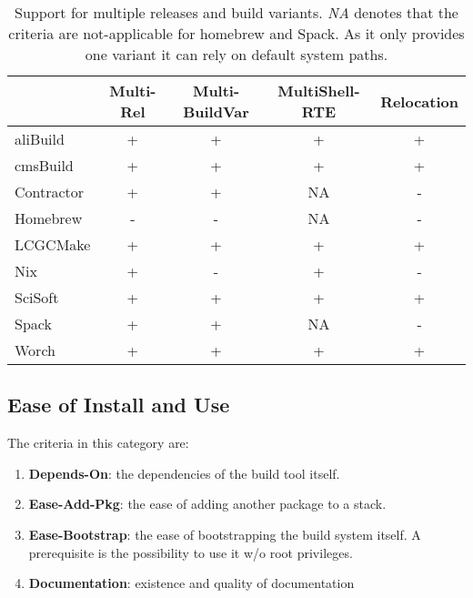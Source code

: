 \documentclass[12pt,a4paper]{article}
\begin{document}
\begin{table}
\centering
\begin{tabular}{lcccc}
&Multi-Rel & Multi-BuildVar & MultiShell-RTE & Relocation \\ \hline
aliBuild & \cellcolor{green} +  & \cellcolor{green} + & \cellcolor{green} + & \cellcolor{green} + \\
cmsBuild & \cellcolor{green} +  & \cellcolor{green} + & \cellcolor{green} + & \cellcolor{green} + \\
Contractor & \cellcolor{green} + & \cellcolor{green} + & \cellcolor{yellow} NA  &  \cellcolor{red} - \\
Homebrew &  \cellcolor{red} - & \cellcolor{red} -   & \cellcolor{yellow} NA   & \cellcolor{red} -  \\
LCGCMake & \cellcolor{green} + & \cellcolor{green} + & \cellcolor{green} + & \cellcolor{green} +\\
Nix & \cellcolor{green} + & \cellcolor{red} - & \cellcolor{green} +  & \cellcolor{red} -\\
SciSoft &  \cellcolor{green} + & \cellcolor{green} + &  \cellcolor{green} + & \cellcolor{green} + \\
Spack & \cellcolor{green} + & \cellcolor{green} + & \cellcolor{yellow} NA & \cellcolor{red} -\\
Worch &  \cellcolor{green} + &  \cellcolor{green}  + &  \cellcolor{green} + &  \cellcolor{green} +
\end{tabular}
\caption{\label{tab:taxonomyVariants}Support for multiple releases and build variants. \emph{NA} denotes that the criteria are not-applicable for homebrew and Spack. As it only provides one variant it can rely on default system paths.}
\end{table}

\subsection{Ease of Install and Use}
The criteria in this category are:
\begin{enumerate}
\item \textbf{Depends-On}: the dependencies of the build tool itself.
\item \textbf{Ease-Add-Pkg}: the ease of adding another package to a stack.
\item \textbf{Ease-Bootstrap}: the ease of bootstrapping the build system itself. A prerequisite is the possibility to use it w/o root privileges.
\item \textbf{Documentation}: existence and quality of documentation
\end{enumerate}
\end{document}
